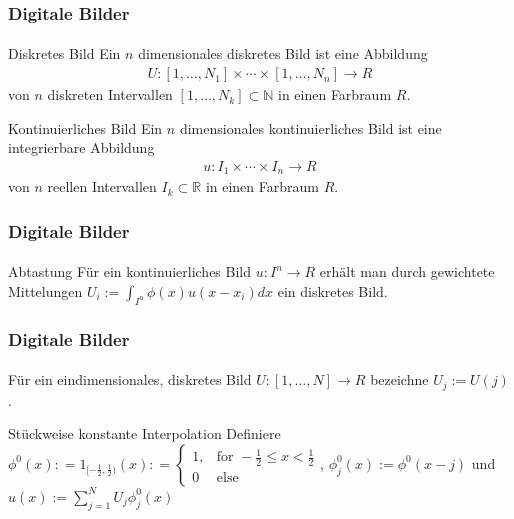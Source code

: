 \documentclass{beamer}
\begin{document}
\begin{frame}
    \frametitle{Digitale Bilder}
\framesubtitle{}

   \begin{block}{Diskretes Bild}
Ein $n$ dimensionales diskretes Bild ist eine Abbildung 
\begin{align*}
U : [1, \ldots, N_1] \times   \cdots \times [1, \ldots, N_n]   \to R
\end{align*}
von $n$ diskreten Intervallen  $[1, \ldots, N_k]  \subset \mathbb{N}$  in einen Farbraum $R$.
\end{block}

   \begin{block}{Kontinuierliches Bild}
Ein $n$ dimensionales kontinuierliches Bild ist eine integrierbare Abbildung 
\begin{align*}
u : I_1 \times   \cdots \times I_n   \to R
\end{align*}
von $n$ reellen Intervallen $I_k \subset \mathbb{R}$ in einen Farbraum $R$.
\end{block}

 \end{frame}


\begin{frame}
    \frametitle{Digitale Bilder}
\framesubtitle{}
\begin{block}{Abtastung}
Für ein kontinuierliches  Bild $u : I^n \to R$ erhält man durch gewichtete Mittelungen
$U_i := \int_{I^n} \phi (x) u(x - x_i) dx$ ein diskretes Bild. 
\end{block}
 \end{frame}

\begin{frame}
    \frametitle{Digitale Bilder}
\framesubtitle{}
    \begin{block}{}
Für ein eindimensionales, diskretes Bild $U : [1, \ldots, N]  \to R$ bezeichne  $U_{j} := U(j)$.
\end{block}
    \begin{block}{Stückweise konstante Interpolation}
Definiere $\phi^0 (x) : = 1_{ [-\frac{1} {2} ,  \frac{1} {2}) }(x) : =\begin{cases}
   1 , & \text{for } -\frac{1} {2}  \leq x < \frac{1} {2}  \\
    0  & \text{else } 
  \end{cases} $, $\phi^0_j(x):= \phi^0 (x - j)$ und
 $u(x) := \sum_{j=1}^{N} U_j \phi^0_j(x)$ 
\end{block}

 \end{frame}
\end{document}
